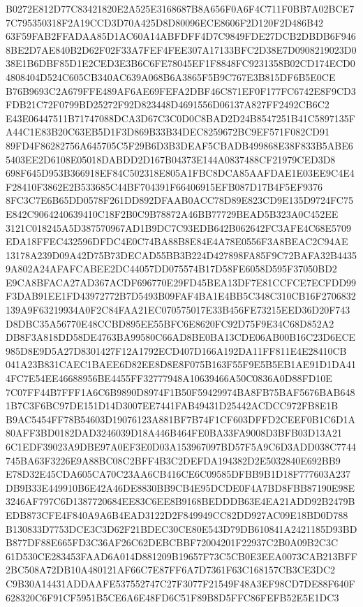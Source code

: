 \documentclass[UTF8,fontset=fandol,zihao=-4,a4paper]{ctexart}
\begin{document}
{{B0272E812D77C83421820E2A525E3168687B8A656F0A6F4C711F0BB7A02BCE77C795350318F2A19CCD3D70A425D8D80096ECE8606F2D120F2D486B42
63F59FAB2FFADAA85D1AC60A14ABFDFF4D7C9849FDE27DCB2DBDB6F9468BE2D7AE840B2D62F02F33A7FEF4FEE307A17133BFC2D38E7D0908219023D0
38E1B6DBF85D1E2CED3E3B6C6FE78045EF1F8848FC9231358B02CD174ECD04808404D524C605CB340AC639A068B6A3865F5B9C767E3B815DF6B5E0CE
B76B9693C2A679FFE489AF6AE69FEFA2DBF46C871EF0F177FC6742E8F9CD3FDB21C72F0799BD25272F92D823448D4691556D06137A827FF2492CB6C2
E43E06447511B71747088DCA3D67C3C0D0C8BAD2D24B8547251B41C5897135FA44C1E83B20C63EB5D1F3D869B33B34DEC8259672BC9EF571F082CD91
89FD4F86282756A645705C5F29B6D3B3DEAF5CBADB499868E38F833B5ABE65403EE2D6108E05018DABDD2D167B04373E144A0837488CF21979CED3D8
698F645D953B366918EF84C502318E805A1FBC8DCA85AAFDAE1E03EE9C4E4F28410F3862E2B533685C44BF704391F66406915EFB087D17B4F5EF9376
8FC3C7E6B65DD0578F261DD892DFAAB0ACC78D89E823CD9E135D9724FC75E842C9064240639410C18F2B0C9B78872A46BB77729BEAD5B323A0C452EE
3121C018245A5D387570967AD1B9DC7C93EDB642B062642FC3AFE4C68E5709EDA18FFEC432596DFDC4E0C74BA88B8E84E4A78E0556F3A8BEAC2C94AE
13178A239D09A42D75B73DECAD55BB3B224D427898FA85F9C72BAFA32B44359A802A24AFAFCABEE2DC44057DD075574B17D58FE6058D595F37050BD2
E9CA8BFACA27AD367ACDF696770E29FD45BEA13DF7E81CCFCE7ECFDD99F3DAB91EE1FD43972772B7D5493B09FAF4BA1E4BB5C348C310CB16F2706832
139A9F63219934A0F2C84FAA21EC070575017E33B456FE73215EED36D20F743D8DBC35A56770E48CCBD895EE55BFC6E8620FC92D75F9E34C68D852A2
DB8F3A818DD58DE4763BA99580C66AD8BE0BA13CDE06AB00B16C23D6ECE985D8E9D5A27D8301427F12A1792ECD407D166A192DA11FF811E4E28410CB
041A23B831CAEC1BAEE6D82EE8D8E8F075B163F55F9E5B5EB1AE91D1DA414FC7E54EE46688956BE4455FF32777948A10639466A50C0836A0D88FD10E
7C07FF44B7FFF1A6C6B9890D8974F1B50F59429974BA8FB75BAF5676BAB6481B7C3F6BC97DE151D14D3007EE7441FAB49431D25442ACDCC972FB8E1B
B9AC5454FF78B54603D19076123A881BF7B74F1CF603DFFD2CEEF0B1C6D1A80AFF3BD0182DAD3246039D18A446B464FE0BA33FA9008D3BFB03D13A21
6C1EDF39023A9DBE97A0EF3E0D03A153967097BD57F5A9C6D3ADD038C7744745BA63F3226E9A88BC08C2BFF4B3C2DEFDA194382D2E5032840E692BB9
E78D32E45CDA605CA70C23AA6CB416CE6C09585DFBB9B1D18F777603A237DB9B33E449910B6E42A46DE8830BB9CB4E95DCDE0F4A7BD8FBB87190E98E
3246AF797C6D1387720684EE83C6EE8B9168BEDDDB63E4EA21ADD92B2479BEDB873CFE4F840A9A6B4EAD3122D2F849949CC82DD927AC09E18BD0D788
B130833D7753DCE3C3D62F21BDEC30CE80E543D79DB610841A2421185D93BDB877DF88E665FD3C36AF26C62DEBCBBF72004201F22937C2B0A09B2C3C
61D530CE283453FAAD6A014D881209B19657F73C5CB0E3EEA0073CAB213BFF2BC508A72DB10A480121AF66C7E87FF6A7D7361F63C168157CB3CE3DC2
C9B30A14431ADDAAFE537552747C27F3077F21549F48A3EF98CD7DE88F640F628320C6F91CF5951B5CE6A6E48FD6C51F89B8D5FFC86FEFB52E5E1DC3
}}
\end{document}
